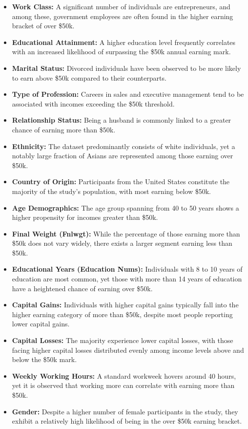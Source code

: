 \documentclass[10pt]{article}
\begin{document}
\begin{flushleft}
\begin{itemize}
  \item \textbf{Work Class:} A significant number of individuals are entrepreneurs, and among these, government employees are often found in the higher earning bracket of over \$50k.
  \item \textbf{Educational Attainment:} A higher education level frequently correlates with an increased likelihood of surpassing the \$50k annual earning mark.
  \item \textbf{Marital Status:} Divorced individuals have been observed to be more likely to earn above \$50k compared to their counterparts.
  \item \textbf{Type of Profession:} Careers in sales and executive management tend to be associated with incomes exceeding the \$50k threshold.
  \item \textbf{Relationship Status:} Being a husband is commonly linked to a greater chance of earning more than \$50k.
  \item \textbf{Ethnicity:} The dataset predominantly consists of white individuals, yet a notably large fraction of Asians are represented among those earning over \$50k.
  \item \textbf{Country of Origin:} Participants from the United States constitute the majority of the study's population, with most earning below \$50k.
  \item \textbf{Age Demographics:} The age group spanning from 40 to 50 years shows a higher propensity for incomes greater than \$50k.
  \item \textbf{Final Weight (Fnlwgt):} While the percentage of those earning more than \$50k does not vary widely, there exists a larger segment earning less than \$50k.
  \item \textbf{Educational Years (Education Nums):} Individuals with 8 to 10 years of education are most common, yet those with more than 14 years of education have a heightened chance of earning over \$50k.
  \item \textbf{Capital Gains:} Individuals with higher capital gains typically fall into the higher earning category of more than \$50k, despite most people reporting lower capital gains.
  \item \textbf{Capital Losses:} The majority experience lower capital losses, with those facing higher capital losses distributed evenly among income levels above and below the \$50k mark.
  \item \textbf{Weekly Working Hours:} A standard workweek hovers around 40 hours, yet it is observed that working more can correlate with earning more than \$50k.
  \item \textbf{Gender:} Despite a higher number of female participants in the study, they exhibit a relatively high likelihood of being in the over \$50k earning bracket.
\end{itemize}


\end{flushleft}
\end{document}
